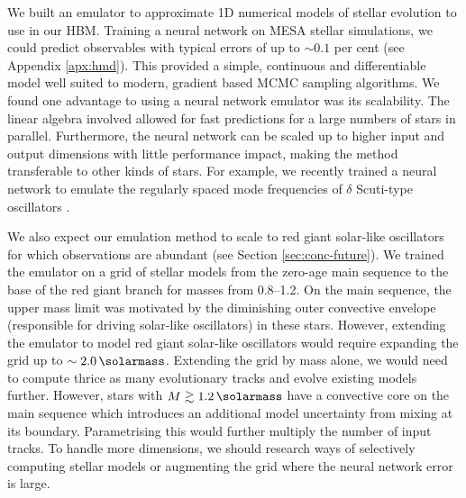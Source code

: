 We built an emulator to approximate 1D numerical models of stellar evolution to use in our HBM. Training a neural network on MESA stellar simulations, we could predict observables with typical errors of up to \(\sim 0.1\) per cent (see Appendix \ref{apx:hmd}). This provided a simple, continuous and differentiable model well suited to modern, gradient based MCMC sampling algorithms. We found one advantage to using a neural network emulator was its scalability. The linear algebra involved allowed for fast predictions for a large numbers of stars in parallel. Furthermore, the neural network can be scaled up to higher input and output dimensions with little performance impact, making the method transferable to other kinds of stars. For example, we recently trained a neural network to emulate the regularly spaced mode frequencies of \(\delta\) Scuti-type oscillators \citep{Scutt.Murphy.ea2023}. 

We also expect our emulation method to scale to red giant solar-like oscillators for which observations are abundant (see Section \ref{sec:conc-future}). We trained the emulator on a grid of stellar models from the zero-age main sequence to the base of the red giant branch for masses from \SIrange{0.8}{1.2}{\solarmass}. On the main sequence, the upper mass limit was motivated by the diminishing outer convective envelope (responsible for driving solar-like oscillators) in these stars. However, extending the emulator to model red giant solar-like oscillators would require expanding the grid up to \(\sim\SI{2.0}{\solarmass}\). Extending the grid by mass alone, we would need to compute thrice as many evolutionary tracks and evolve existing models further. However, stars with \(M \gtrsim \SI{1.2}{\solarmass}\) have a convective core on the main sequence which introduces an additional model uncertainty from mixing at its boundary. Parametrising this would further multiply the number of input tracks. To handle more dimensions, we should research ways of selectively computing stellar models or augmenting the grid \citep[e.g.][]{Li.Davies.ea2022} where the neural network error is large.


